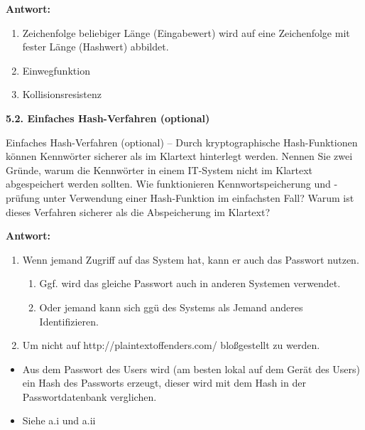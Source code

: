 \documentclass[ngerman]{fbi-aufgabenblatt}
\begin{document}
\textbf{Antwort:}
    \begin{enumerate}
    \item Zeichenfolge beliebiger Länge (Eingabewert) wird auf eine Zeichenfolge mit fester Länge (Hashwert) abbildet.
    \item Einwegfunktion
    \item Kollisionsresistenz
    \end{enumerate}

\textbf{5.2. Einfaches Hash-Verfahren (optional)}

Einfaches Hash-Verfahren (optional) – Durch kryptographische Hash-Funktionen können Kennwörter sicherer als im Klartext hinterlegt werden. Nennen Sie zwei Gründe, warum die Kennwörter in einem IT-System nicht im Klartext abgespeichert werden sollten. Wie funktionieren Kennwortspeicherung und -prüfung unter Verwendung einer Hash-Funktion im einfachsten Fall? Warum ist dieses Verfahren sicherer als die Abspeicherung im Klartext?

\textbf{Antwort:}
   \begin{enumerate}
    \item Wenn jemand Zugriff auf das System hat, kann er auch das Passwort nutzen. 
    \begin{enumerate}
    \item Ggf. wird das gleiche Passwort auch in anderen Systemen verwendet.
    \item Oder jemand kann sich ggü des Systems als Jemand anderes Identifizieren.
    \end{enumerate}
    \item Um nicht auf http://plaintextoffenders.com/ bloßgestellt zu werden.
    \end{enumerate} 
    
    \begin{itemize}
    \item Aus dem Passwort des Users wird (am besten lokal auf dem Gerät des Users) ein Hash des Passworts erzeugt, dieser wird mit dem Hash in der Passwortdatenbank verglichen.
    \item Siehe a.i und a.ii
    \end{itemize}
\end{document}

